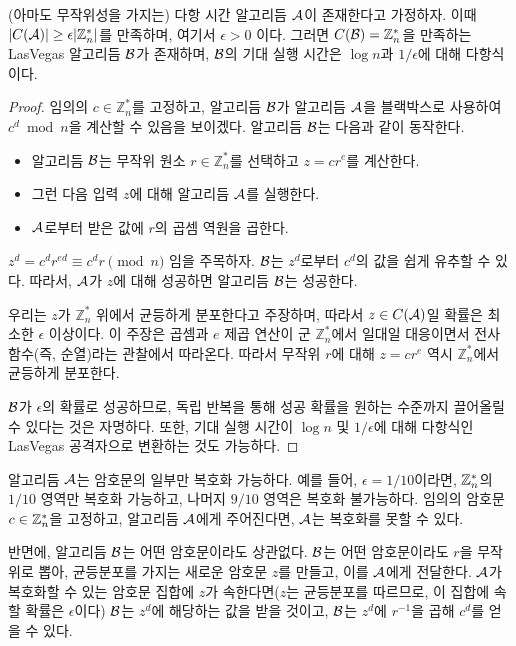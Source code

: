 \begin{theorem}
    (아마도 무작위성을 가지는) 다항 시간 알고리듬 $\mathcal{A}$이 존재한다고 가정하자.
    이때 $|C(\mathcal{A})| \geq \epsilon |\mathbb{Z}^*_n|$를 만족하며, 여기서 $\epsilon >
    0$ 이다. 그러면 $C(\mathcal{B}) = \mathbb{Z}^*_n$을 만족하는 LasVegas 알고리듬
    $\mathcal{B}$가 존재하며, $\mathcal{B}$의 기대 실행 시간은 $\log n$과 $1/\epsilon$에 대해
    다항식이다.
\end{theorem}

\begin{proof}
    임의의 $c \in \mathbb{Z}_n^*$를 고정하고, 알고리듬 $\mathcal{B}$가 알고리듬 $\mathcal{A}$을
    블랙박스로 사용하여 $c^d \bmod n$을 계산할 수 있음을 보이겠다. 알고리듬
    $\mathcal{B}$는 다음과 같이 동작한다.
    \begin{itemize}
        \item 알고리듬 $\mathcal{B}$는 무작위 원소 $r \in \mathbb{Z}_n^*$를 선택하고 $z = cr^e$를 계산한다. 
        \item 그런 다음 입력 $z$에 대해 알고리듬 $\mathcal{A}$를 실행한다.
        \item $\mathcal{A}$로부터 받은 값에 $r$의 곱셈 역원을 곱한다.
    \end{itemize}
    $z^d = c^d r^{ed} \equiv c^d r \pmod n$ 임을 주목하자. $\mathcal{B}$는 $z^d$로부터
    $c^d$의 값을 쉽게 유추할 수 있다. 따라서, $\mathcal{A}$가 $z$에 대해 성공하면 알고리듬
    $\mathcal{B}$는 성공한다.

    우리는 $z$가 $\mathbb{Z}_n^*$ 위에서 균등하게 분포한다고 주장하며, 따라서 $z
    \in C(\mathcal{A})$일 확률은 최소한 $\epsilon$ 이상이다. 이 주장은 곱셈과 $e$ 제곱
    연산이 군 $\mathbb{Z}_n^*$에서 일대일 대응이면서 전사 함수(즉, 순열)라는
    관찰에서 따라온다. 따라서 무작위 $r$에 대해 $z = cr^e$ 역시
    $\mathbb{Z}_n^*$에서 균등하게 분포한다.

    $\mathcal{B}$가 $\epsilon$의 확률로 성공하므로, 독립 반복을 통해 성공 확률을 원하는
    수준까지 끌어올릴 수 있다는 것은 자명하다. 또한, 기대 실행 시간이 $\log n$
    및 $1/\epsilon$에 대해 다항식인 LasVegas 공격자으로 변환하는 것도 가능하다.
\end{proof}

\begin{memo}
    알고리듬 $\mathcal{A}$는 암호문의 일부만 복호화 가능하다. 예를 들어, $\epsilon =
    1/10$이라면, $\mathbb{Z}^*_n$의 $1/10$ 영역만 복호화 가능하고, 나머지 $9/10$ 영역은
    복호화 불가능하다. 임의의 암호문 $c \in \mathbb{Z}^*_n$을 고정하고, 알고리듬
    $\mathcal{A}$에게 주어진다면, $\mathcal{A}$는 복호화를 못할 수 있다.

    반면에, 알고리듬 $\mathcal{B}$는 어떤 암호문이라도 상관없다. $\mathcal{B}$는 어떤 암호문이라도
    $r$을 무작위로 뽑아, 균등분포를 가지는 새로운 암호문 $z$를 만들고, 이를
    $\mathcal{A}$에게 전달한다. $\mathcal{A}$가 복호화할 수 있는 암호문 집합에 $z$가
    속한다면($z$는 균등분포를 따르므로, 이 집합에 속할 확률은 $\epsilon$이다) $\mathcal{B}$는 $z^d$에 해당하는 값을 받을
    것이고, $\mathcal{B}$는 $z^d$에 $r^{-1}$을 곱해 $c^d$를 얻을 수 있다.
\end{memo}

